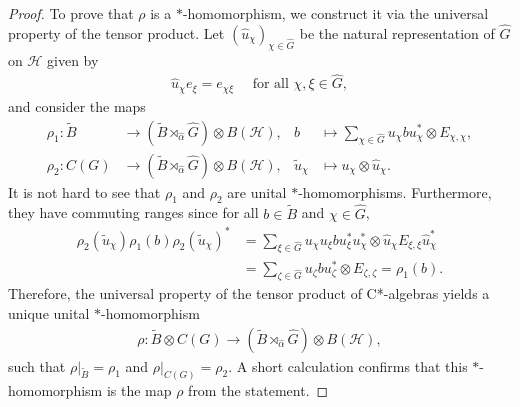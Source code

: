 \documentclass{amsart}
\theoremstyle{definition}
\theoremstyle{definition}
\begin{document}
\begin{proof}
    To prove that $\rho$ is a $\ast$-homomorphism, we construct it via the universal property of the tensor product.
    Let $(\hat{u}_\chi)_{\chi \in \hat{G}}$ be the natural representation of $\hat{G}$ on $\mathcal{H}$ given by 
    \begin{align*}
        \hat{u}_\chi e_\xi = e_{\chi \xi} \quad \text{ for all } \chi, \xi \in \hat{G},
    \end{align*}
    and consider the maps
    \begin{align*}
        \rho_1: \tilde{B} &\to \left(\tilde{B} \rtimes_{\hat{\alpha}} \hat{G}\right) \otimes B(\mathcal{H}), & b &\mapsto \sum_{\chi \in \hat{G}} u_\chi b u_\chi^\ast \otimes E_{\chi, \chi}, \\
        \rho_2: C(G) &\to \left(\tilde{B} \rtimes_{\hat{\alpha}} \hat{G}\right) \otimes B(\mathcal{H}), & \tilde{u}_\chi &\mapsto u_\chi \otimes \hat{u}_\chi.
    \end{align*}
    It is not hard to see that $\rho_1$ and $\rho_2$ are unital $\ast$-homomorphisms. Furthermore, they have commuting ranges since for all $b \in \tilde{B}$ and $\chi \in \hat{G}$,
    \begin{align*}
        \rho_2(\tilde{u}_\chi) \rho_1(b) \rho_2(\tilde{u}_\chi)^\ast 
            &= \sum_{\xi \in \hat{G}} u_\chi u_\xi b u_\xi^\ast u_\chi^\ast \otimes \hat{u}_\chi E_{\xi, \xi} \hat{u}_\chi^\ast \\
            &= \sum_{\zeta \in \hat{G}} u_\zeta b u_\zeta^\ast \otimes E_{\zeta, \zeta}
            = \rho_1(b).
    \end{align*}
    Therefore, the universal property of the tensor product of C*-algebras yields a unique unital $\ast$-homomorphism
    \begin{align*}
        \rho: \tilde{B} \otimes C(G) \to \left(\tilde{B} \rtimes_{\hat{\alpha}} \hat{G}\right) \otimes B(\mathcal{H}),
    \end{align*}
    such that $\rho|_{\tilde{B}} = \rho_1$ and $\rho|_{C(G)} = \rho_2$. A short calculation confirms that this $\ast$-homomorphism is the map $\rho$ from the statement.


\end{proof}
\end{document}
